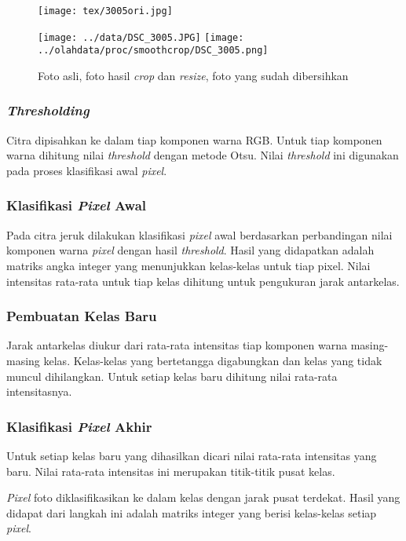 \documentclass[laporan.tex]{subfiles}
\begin{document}
\begin{figure}[h]
\centering
\texttt{[image: tex/3005ori.jpg]}

\vskip 1cm
\texttt{[image: ../data/DSC\_3005.JPG]} \qquad
\texttt{[image: ../olahdata/proc/smoothcrop/DSC\_3005.png]}
\caption{Foto asli, foto hasil \emph{crop} dan \emph{resize}, foto yang sudah dibersihkan}
\end{figure}

\subsubsection{\emph{Thresholding}}

Citra dipisahkan ke dalam tiap komponen warna RGB. Untuk tiap komponen warna dihitung nilai \emph{threshold} dengan metode Otsu. Nilai \emph{threshold} ini digunakan pada proses klasifikasi awal \emph{pixel}.

\subsubsection{Klasifikasi \emph{Pixel} Awal}

Pada citra jeruk dilakukan klasifikasi \emph{pixel} awal berdasarkan perbandingan nilai komponen warna \emph{pixel} dengan hasil \emph{threshold}. Hasil yang didapatkan adalah matriks angka integer yang menunjukkan kelas-kelas untuk tiap pixel. Nilai intensitas rata-rata untuk tiap kelas dihitung untuk pengukuran jarak antarkelas.

\subsubsection{Pembuatan Kelas Baru}

Jarak antarkelas diukur dari rata-rata intensitas tiap komponen warna masing-masing kelas. Kelas-kelas yang bertetangga digabungkan dan kelas yang tidak muncul dihilangkan. Untuk setiap kelas baru dihitung nilai rata-rata intensitasnya.

\subsubsection{Klasifikasi \emph{Pixel} Akhir}

Untuk setiap kelas baru yang dihasilkan dicari nilai rata-rata intensitas yang baru. Nilai rata-rata intensitas ini merupakan titik-titik pusat kelas.

\emph{Pixel} foto diklasifikasikan ke dalam kelas dengan jarak pusat terdekat. Hasil yang didapat dari langkah ini adalah matriks integer yang berisi kelas-kelas setiap \emph{pixel}.
\end{document}
